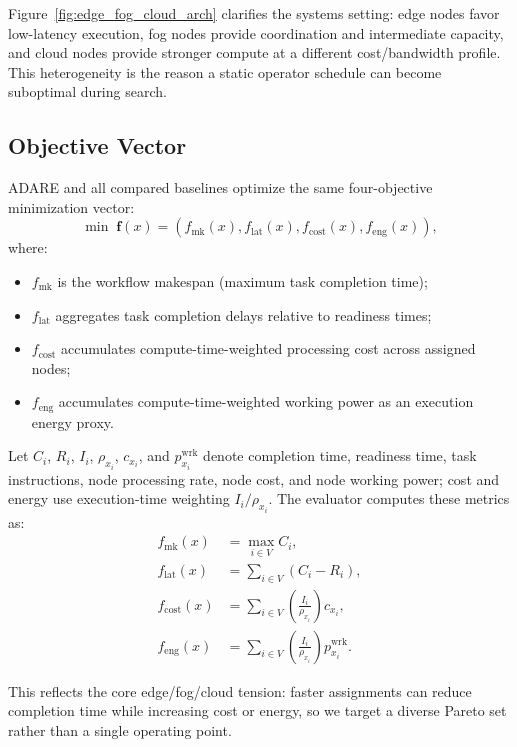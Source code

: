 \documentclass[runningheads]{llncs}
\begin{document}
Figure~\ref{fig:edge_fog_cloud_arch} clarifies the systems setting: edge nodes favor low-latency execution, fog nodes provide coordination and intermediate capacity, and cloud nodes provide stronger compute at a different cost/bandwidth profile. This heterogeneity is the reason a static operator schedule can become suboptimal during search.

\subsection{Objective Vector}
ADARE and all compared baselines optimize the same four-objective minimization vector:
\begin{equation}
\min \; \mathbf{f}(x) = \left(f_{\mathrm{mk}}(x), f_{\mathrm{lat}}(x), f_{\mathrm{cost}}(x), f_{\mathrm{eng}}(x)\right),
\end{equation}
where:
\begin{itemize}
    \item $f_{\mathrm{mk}}$ is the workflow makespan (maximum task completion time);
    \item $f_{\mathrm{lat}}$ aggregates task completion delays relative to readiness times;
    \item $f_{\mathrm{cost}}$ accumulates compute-time-weighted processing cost across assigned nodes;
    \item $f_{\mathrm{eng}}$ accumulates compute-time-weighted working power as an execution energy proxy.
\end{itemize}
Let $C_i$, $R_i$, $I_i$, $\rho_{x_i}$, $c_{x_i}$, and $p^{\mathrm{wrk}}_{x_i}$ denote completion time, readiness time, task instructions, node processing rate, node cost, and node working power; cost and energy use execution-time weighting $I_i / \rho_{x_i}$.
The evaluator computes these metrics as:
\begin{equation}
\label{eq:objective_metrics}
\begin{aligned}
f_{\mathrm{mk}}(x) &= \max_{i \in V} C_i, \\
f_{\mathrm{lat}}(x) &= \sum_{i \in V} \left(C_i - R_i\right), \\
f_{\mathrm{cost}}(x) &= \sum_{i \in V} \left(\frac{I_i}{\rho_{x_i}}\right) c_{x_i}, \\
f_{\mathrm{eng}}(x) &= \sum_{i \in V} \left(\frac{I_i}{\rho_{x_i}}\right) p^{\mathrm{wrk}}_{x_i}.
\end{aligned}
\end{equation}

This reflects the core edge/fog/cloud tension: faster assignments can reduce completion time while increasing cost or energy, so we target a diverse Pareto set rather than a single operating point.
\end{document}
